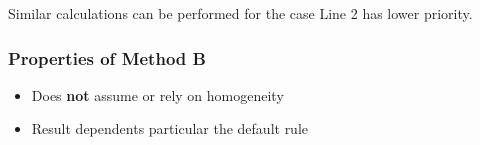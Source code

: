 Similar calculations can be performed for the case Line 2 has lower
priority.

\hypertarget{properties-of-method-b}{%
\subsubsection{Properties of Method B}\label{properties-of-method-b}}

\begin{itemize}
\tightlist
\item
  Does \textbf{not} assume or rely on homogeneity
\item
  Result dependents particular the default rule
\end{itemize}
